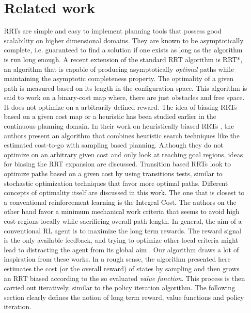 \documentclass[wcp]{jmlr}
\begin{document}
\section{Related work}
RRTs are simple and easy to implement planning tools that possess good scalability on higher dimensional domains. They are known to be asymptotically complete, i.e.  guaranteed to find a solution if one exists as long as the algorithm is run long enough. A recent extension of the standard RRT algorithm is RRT*, an algorithm that is capable of producing asymptotically \emph{optimal} paths while maintaining the asymptotic completeness property\citep{karaman}. The optimality of a given path is measured based on its length in the configuration space. This algorithm is said to work on a binary-cost map where, there are just obstacles and free space. It does not optimize on a arbitrarily defined reward. The idea of biasing RRTs based on a given cost map or a heuristic has been studied earlier in the continuous planning domain. In their work on heuristically biased RRTs \citep{heuristicrrt}, the authors present an algorithm that combines heuristic search techniques like the estimated cost-to-go with sampling based planning. Although they do not optimize on an arbitrary given cost and only look at reaching goal regions, ideas for biasing the RRT expansion are discussed. Transition based RRTs \citep{transrrt,gradientrrt} look to optimize paths based on a given cost by using transitions tests, similar to stochastic optimization techniques that favor more optimal paths. Different concepts of optimality itself are discussed in this work. The one that is closest to a conventional reinforcement learning is the Integral Cost. The authors on the other hand favor a minimum mechanical work criteria that seems to avoid high cost regions locally while sacrificing overall path length. In general, the aim of a conventional RL agent is to maximize the long term rewards. The reward signal is the only available feedback, and trying to optimize other local criteria might lead to distracting the agent from its global aim \citep{jettebicycle}. Our algorithm draws a lot of inspiration from these works. In a rough sense, the algorithm presented here estimates the cost (or the overall reward) of states by sampling and then grows an RRT biased according to the so evaluated \emph{value function}. This process is then carried out iteratively, similar to the policy iteration algorithm. The following section clearly defines the notion of long term reward, value functions and policy iteration.
\end{document}
